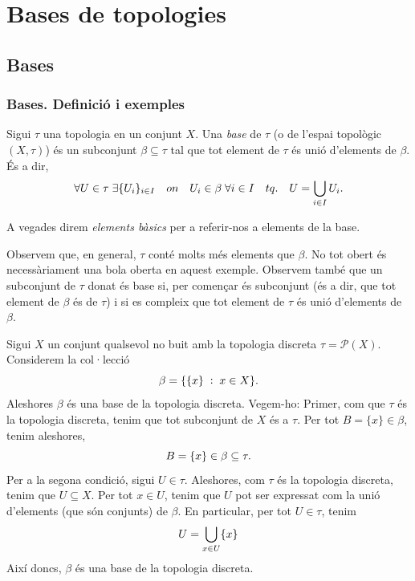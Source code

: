 \documentclass[../main.tex]{subfiles}
\begin{document}
\chapter{Bases de topologies}
\section{Bases}
\subsection{Bases. Definició i exemples}
\begin{defi}
[Base]\label{def:base} Sigui $\tau$ una topologia en un conjunt $X$. Una \textit{base} de $\tau$ (o de l'espai topològic $(X,\tau)$) és un subconjunt $\beta\subseteq \tau$ tal que tot element de $\tau$ és unió d'elements de $\beta$. És a dir,
\begin{equation}
    \notag
    \forall U\in \tau\;\exists\{U_i\}_{i\in I} \quad on\quad U_i\in \beta\;\forall i\in I\quad tq.\quad U = \bigcup_{i\in I}U_i.
\end{equation}
\end{defi}

A vegades direm \textit{elements bàsics} per a referir-nos a elements de la base.


Observem que, en general, $\tau$ conté molts més elements que $\beta$. No tot obert és necessàriament una bola oberta en aquest exemple. Observem també que un subconjunt de $\tau$ donat és base si, per començar és subconjunt (és a dir, que tot element de $\beta$ és de $\tau$) i si es compleix que tot element de $\tau$ és unió d'elements de $\beta$.

\begin{ej}
\label{ej:base1} Sigui $X$ un conjunt qualsevol no buit amb la topologia discreta $\tau = \mathscr{P}(X)$. Considerem la col·lecció
\begin{equation}
    \notag
    \beta = \{\{x\}\;:\;x\in X\} .
\end{equation}
Aleshores $\beta$ és una base de la topologia discreta. Vegem-ho: Primer, com que $\tau$ és la topologia discreta, tenim que tot subconjunt de $X$ és a $\tau$. Per tot $B = \{x\}\in\beta$, tenim aleshores,
\begin{equation}
    \notag
    B = \{x\}\in\beta\subseteq\tau. 
\end{equation}
Per a la segona condició, sigui $U\in\tau$. Aleshores, com $\tau$ és la topologia discreta, tenim que $U\subseteq X$. Per tot $x\in U$, tenim que $U$ pot ser expressat com la unió d'elements (que són conjunts) de $\beta$. En particular, per tot $U\in\tau$, tenim
\begin{equation}
    \notag
    U = \bigcup_{x\in U}\{x\}
\end{equation}
Així doncs, $\beta$ és una base de la topologia discreta.
\end{ej}
\end{document}
